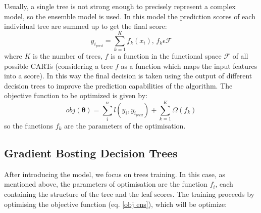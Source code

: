 \documentclass[a4paper, oneside, 11pt, openright]{book}
\begin{document}
			Usually, a single tree is not strong enough to precisely represent a complex model, so the ensemble model is used. In this model the prediction scores of each individual tree are summed up to get the final score:
			\begin{equation}
				y_{i_{pred}} = \sum_{k=1}^{K} f_k(x_i), \, f_k \epsilon \mathcal{F}
				\label{trees' sum}
			\end{equation}
			where $K$ is the number of trees, $f$ is a function in the functional space $\mathcal{F}$ of all possible CARTs (considering a tree $f$ as a function which maps the input features into a score). In this way the final decision is taken using the output of different decision trees to improve the prediction capabilities of the algorithm. The objective function to be optimized is given by:
			\begin{equation}
				obj(\bm{\theta}) = \sum_{i}^{n}l(y_i,y_{i_{pred}}) + \sum_{k=1}^{K}\Omega(f_k)
				\label{obj ens}
			\end{equation}
			so the functions $f_k$ are the parameters of the optimisation.
			
			\subsection{Gradient Bosting Decision Trees}\label{GBDT}
			After introducing the model, we focus on trees training. In this case, as mentioned above, the parameters of optimisation are the function $f_i$, each containing the structure of the tree and the leaf scores. The training proceeds by optimising the objective function (eq. \eqref{obj ens}), which will be optimize:
			
\end{document}
